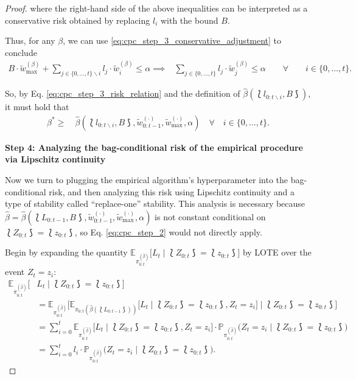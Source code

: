 \begin{proof}
where the right-hand side of the above inequalities can be interpreted as a conservative risk obtained by replacing $l_i$ with the bound $B$.


Thus, for any $\beta$, we can use \eqref{eq:cpc_step_3_conservative_adjustment} to conclude
\begin{align}\label{eq:cpc_step_3_risk_relation}
    B\cdot \tilde{w}_{\max}^{(\beta)} + \sum_{j\in\{0, ..., t\}\backslash i}l_j\cdot\tilde{w}_{i}^{(\beta)} \leq \alpha \implies & \sum_{j\in\{0, ..., t\}}l_j\cdot\tilde{w}_{j}^{(\beta)} \leq \alpha \qquad \forall \qquad i \in \{0, ..., t\}.
\end{align} 

So, by Eq. \eqref{eq:cpc_step_3_risk_relation} and the definition of $\hat{\beta}(\lbag l_{0:t\backslash i}, B \rbag)$, it must hold that 
\begin{align}\label{eq:cpc_pf_step_3_result}
    \beta^* \geq & \ \hat{\beta}(\lbag l_{0:t\backslash i}, B \rbag, \tilde{w}_{0:t-1}^{(\cdot)}, \tilde{w}_{\max}^{(\cdot)}, \alpha) \quad \forall \quad i \in \{0, ..., t\}.
\end{align}

\vspace{1cm}

\textbf{Step 4: Analyzing the bag-conditional risk of the empirical procedure via Lipschitz continuity}

Now we turn to plugging the empirical algorithm's hyperparameter into the bag-conditional risk, and then analyzing this risk using Lipschitz continuity and a type of stability called ``replace-one'' stability. This analysis is necessary because $\hat\beta=\hat{\beta}(\lbag L_{0:t-1}, B \rbag, \tilde{w}_{0:t-1}^{(\cdot)}, \tilde{w}_{\max}^{(\cdot)}, \alpha)$ is not constant conditional on $\lbag Z_{0:t} \rbag = \lbag z_{0:t} \rbag$, so Eq. \eqref{eq:cpc_step_2} would not directly apply. 

Begin by expanding the quantity $\mathbb{E}_{\pi_{0:t}^{(\hat\beta)}}\Big[L_{t} \mid \lbag Z_{0:t} \rbag = \lbag z_{0:t} \rbag\Big]$ by LOTE over the event $Z_{t}=z_i$:
\begin{align}\label{eq:cpc_empirical_bag_cond_LOTE}
    \mathbb{E}_{\pi_{0:t}^{(\hat\beta)}}\Big[&L_{t} \mid \lbag Z_{0:t} \rbag = \lbag z_{0:t} \rbag\Big] \nonumber \\
    & = \mathbb{E}_{\pi_{0:t}^{(\hat\beta)}}\Big[\mathbb{E}_{\pi_{0:t}(\hat{\beta}(\lbag L_{0:t-1} \rbag))}\Big[L_{t} \mid \lbag Z_{0:t} \rbag = \lbag z_{0:t} \rbag, Z_{t}=z_i\Big] \mid \lbag Z_{0:t} \rbag = \lbag z_{0:t} \rbag\Big] \nonumber \\
    & = \sum_{i=0}^{t}\mathbb{E}_{\pi_{0:t}^{(\hat\beta)}}\Big[L_{t} \mid \lbag Z_{0:t} \rbag = \lbag z_{0:t} \rbag, Z_{t}=z_i\Big]\cdot \mathbb{P}_{\pi_{0:t}^{(\hat\beta)}}\big(Z_{t}=z_i \mid \lbag Z_{0:t} \rbag = \lbag z_{0:t} \rbag\big) \nonumber \\
    & = \sum_{i=0}^{t}l_i\cdot \mathbb{P}_{\pi_{0:t}^{(\hat\beta)}}\big(Z_{t}=z_i \mid \lbag Z_{0:t} \rbag = \lbag z_{0:t} \rbag\big).
\end{align}



\end{proof}
